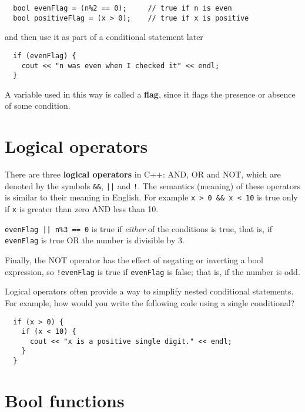 \begin{verbatim}
  bool evenFlag = (n%2 == 0);     // true if n is even
  bool positiveFlag = (x > 0);    // true if x is positive
\end{verbatim}
%
and then use it as part of a conditional statement later

\begin{verbatim}
  if (evenFlag) {
    cout << "n was even when I checked it" << endl;
  }
\end{verbatim}
%
A variable used in this way is called a {\bf flag},
since it flags the presence or absence of some condition.


\section{Logical operators}

There are three {\bf logical operators} in C++: AND, OR and NOT,
which are denoted by the symbols {\tt \&\&}, {\tt ||} and
{\tt !}.  The semantics (meaning) of these operators is similar
to their meaning in English.  For example {\tt x > 0 \&\& x < 10}
is true only if {\tt x} is greater than zero AND less than 10.


{\tt evenFlag || n\%3 == 0} is true if {\em either} of
the conditions is true, that is, if {\tt evenFlag} is true OR the
number is divisible by 3.

Finally, the NOT operator has the effect of negating or
inverting a bool expression, so {\tt !evenFlag} is true
if {\tt evenFlag} is false; that is, if the number is odd.


Logical operators often provide a way to simplify nested
conditional statements.  For example, how would you write
the following code using a single conditional?

\begin{verbatim}
  if (x > 0) {
    if (x < 10) {
      cout << "x is a positive single digit." << endl;
    }
  }
\end{verbatim}

\section{Bool functions}
\label{bool}

